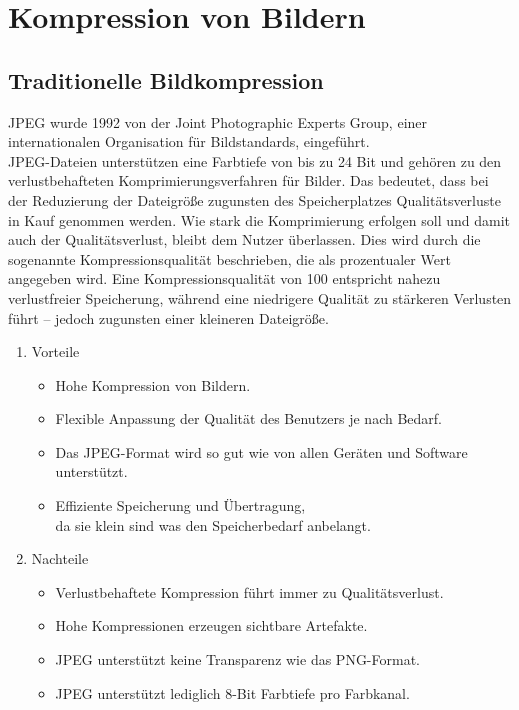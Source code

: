 \newpage
    \section{Kompression von Bildern}
        \subsection{Traditionelle Bildkompression}
            \cite{jpeg_paper, wikipedia_jpeg} JPEG wurde 1992 von der Joint Photographic Experts Group, einer internationalen Organisation für Bildstandards, eingeführt.\\
            JPEG-Dateien unterstützen eine Farbtiefe von bis zu 24 Bit und gehören zu den verlustbehafteten Komprimierungsverfahren für Bilder. Das bedeutet, dass bei der Reduzierung der Dateigröße zugunsten des Speicherplatzes Qualitätsverluste in Kauf genommen werden. Wie stark die Komprimierung erfolgen soll und damit auch der Qualitätsverlust, bleibt dem Nutzer überlassen.
            Dies wird durch die sogenannte Kompressionsqualität beschrieben, die als prozentualer Wert angegeben wird. Eine Kompressionsqualität von 100 entspricht nahezu verlustfreier Speicherung, während eine niedrigere Qualität zu stärkeren Verlusten führt – jedoch zugunsten einer kleineren Dateigröße.

            \begin{enumerate}
                \item Vorteile
                \begin{itemize}
                    \item Hohe Kompression von Bildern.
                    \item Flexible Anpassung der Qualität des Benutzers je nach Bedarf.
                    \item Das JPEG-Format wird so gut wie von allen Geräten und Software unterstützt.
                    \item Effiziente Speicherung und Übertragung,\\
                    da sie klein sind was den Speicherbedarf anbelangt.
                \end{itemize}
                \item Nachteile
                \begin{itemize}
                    \item Verlustbehaftete Kompression führt immer zu Qualitätsverlust.
                    \item Hohe Kompressionen erzeugen sichtbare Artefakte.
                    \item JPEG unterstützt keine Transparenz wie das PNG-Format.
                    \item JPEG unterstützt lediglich $8$-Bit Farbtiefe pro Farbkanal.
                \end{itemize}
            \end{enumerate} 

